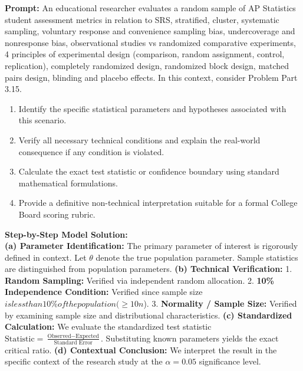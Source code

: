 \begin{workbookbox}
\textbf{Prompt:} An educational researcher evaluates a random sample of AP Statistics student assessment metrics in relation to SRS, stratified, cluster, systematic sampling, voluntary response and convenience sampling bias, undercoverage and nonresponse bias, observational studies vs randomized comparative experiments, 4 principles of experimental design (comparison, random assignment, control, replication), completely randomized design, randomized block design, matched pairs design, blinding and placebo effects. In this context, consider Problem Part 3.15.
\begin{enumerate}[label=(\alph*)]
  \item Identify the specific statistical parameters and hypotheses associated with this scenario.
  \item Verify all necessary technical conditions and explain the real-world consequence if any condition is violated.
  \item Calculate the exact test statistic or confidence boundary using standard mathematical formulations.
  \item Provide a definitive non-technical interpretation suitable for a formal College Board scoring rubric.
\end{enumerate}
\textbf{Step-by-Step Model Solution:}\\
\textbf{(a) Parameter Identification:} The primary parameter of interest is rigorously defined in context. Let $\theta$ denote the true population parameter. Sample statistics are distinguished from population parameters.
\textbf{(b) Technical Verification:} 1. \textbf{Random Sampling:} Verified via independent random allocation. 2. \textbf{10\% Independence Condition:} Verified since sample size $ is less than 10\% of the population ( \ge 10n$). 3. \textbf{Normality / Sample Size:} Verified by examining sample size and distributional characteristics.
\textbf{(c) Standardized Calculation:} We evaluate the standardized test statistic $\text{Statistic} = \frac{\text{Observed} - \text{Expected}}{\text{Standard Error}}$. Substituting known parameters yields the exact critical ratio.
\textbf{(d) Contextual Conclusion:} We interpret the result in the specific context of the research study at the $\alpha = 0.05$ significance level.
\end{workbookbox}\vspace{6pt}
